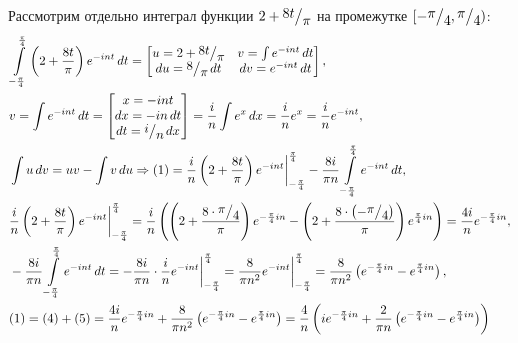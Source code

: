 \documentclass[a4paper, 16pt]{article}
\newcommand{\frc}[2]{\raisebox{2pt}{$#1$}\big/\raisebox{-3pt}{$#2$}}
\begin{document}
\noindent Рассмотрим отдельно интеграл функции $2+\frc{8t}{\pi}$ на промежутке $[-\frc{\pi}{4}, \frc{\pi}{4})$:
\begin{align}
    & \int\limits_{-\frac{\pi}{4}}^{\frac{\pi}{4}}\left(2+\dfrac{8t}{\pi}\right)e^{-int}\,dt=
    \begin{bmatrix}
        u=2+\frc{8t}{\pi} &v=\int e^{-int}\,dt\\
        du=\frc{8}{\pi}\,dt &dv=e^{-int}\,dt
    \end{bmatrix},\\
    & v=\int e^{-int}\,dt=
    \begin{bmatrix}
        x=-int\\
        dx=-in\,dt\\
        dt=\frc{i}{n}\,dx
    \end{bmatrix}=
    \dfrac{i}{n}\int e^{x}\,dx=\dfrac{i}{n}e^{x}=\dfrac{i}{n}e^{-int},\\
    & \int u\,dv=uv-\int v\,du\Rightarrow (1)=\dfrac{i}{n}\left(2+\dfrac{8t}{\pi}\right)e^{-int}\bigg|_{-\frac{\pi}{4}}^{\frac{\pi}{4}}-\dfrac{8i}{\pi n}\int\limits_{-\frac{\pi}{4}}^{\frac{\pi}{4}}e^{-int}\,dt,\\
    & \dfrac{i}{n}\left(2+\dfrac{8t}{\pi}\right)e^{-int}\bigg|_{-\frac{\pi}{4}}^{\frac{\pi}{4}}=\dfrac{i}{n}\left(\left(2+\dfrac{8\cdot\frc{\pi}{4}}{\pi}\right)e^{-\frac{\pi}{4}in}-\left(2+\dfrac{8\cdot\left(-\frc{\pi}{4}\right)}{\pi}\right)e^{\frac{\pi}{4}in}\right)=\dfrac{4i}{n}e^{-\frac{\pi}{4}in},\\
    & -\dfrac{8i}{\pi n}\int\limits_{-\frac{\pi}{4}}^{\frac{\pi}{4}}e^{-int}\,dt=-\dfrac{8i}{\pi n}\cdot\dfrac{i}{n}e^{-int}\bigg|_{-\frac{\pi}{4}}^{\frac{\pi}{4}}=\dfrac{8}{\pi n^2}e^{-int}\bigg|_{-\frac{\pi}{4}}^{\frac{\pi}{4}}=\dfrac{8}{\pi n^2}\left(e^{-\frac{\pi}{4}in}-e^{\frac{\pi}{4}in}\right),\\
    & (1)=(4)+(5)=\dfrac{4i}{n}e^{-\frac{\pi}{4}in}+\dfrac{8}{\pi n^2}\left(e^{-\frac{\pi}{4}in}-e^{\frac{\pi}{4}in}\right)=\dfrac{4}{n}\left(ie^{-\frac{\pi}{4}in}+\dfrac{2}{\pi n}\left(e^{-\frac{\pi}{4}in}-e^{\frac{\pi}{4}in}\right)\right)
\end{align}
\end{document}
